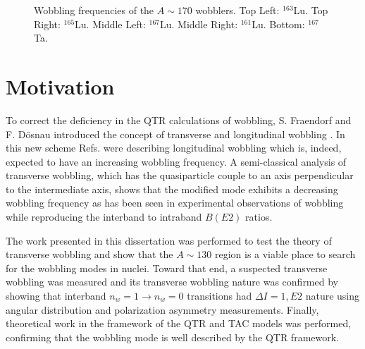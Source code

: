 \begin{figure}[ht!]
	\caption{Wobbling frequencies of the $A\sim{}170$ wobblers. Top Left: $^{163}$Lu. Top Right: $^{165}$Lu. Middle Left: $^{167}$Lu. Middle Right: $^{161}$Lu. Bottom: $^{167}$Ta.\label{fig:chp1-old-wobb-freq}}
\end{figure}

\section{Motivation}
\label{ssec:intro-rot-motivation}
To correct the deficiency in the QTR calculations of wobbling, S. Fraendorf and F. D\"{o}snau introduced the concept of transverse and longitudinal wobbling \cite{frauendorfTransverseWobbling}. In this new scheme Refs. \cite{oldQTRWobblingTheory1,oldQTRWobblingTheory2,oldQTRWobblingTheory3,oldQTRWobblingTheory4} were describing longitudinal wobbling which is, indeed, expected to have an increasing wobbling frequency. A semi-classical analysis of transverse wobbling, which has the quasiparticle couple to an axis perpendicular to the intermediate axis, shows that the modified mode exhibits a decreasing wobbling frequency as has been seen in experimental observations of wobbling while reproducing the interband to intraband $B(E2)$ ratios.

The work presented in this dissertation was performed to test the theory of transverse wobbling and show that the $A\sim{}130$ region is a viable place to search for the wobbling modes in nuclei. Toward that end, a suspected transverse wobbling was measured \pr{} and its transverse wobbling nature was confirmed by showing that interband $n_w=1\rightarrow{}n_w=0$ transitions had $\Delta{}I=1, E2$ nature using angular distribution and polarization asymmetry measurements. Finally, theoretical work in the framework of the QTR and TAC models was performed, confirming that the wobbling mode is well described by the QTR framework.
